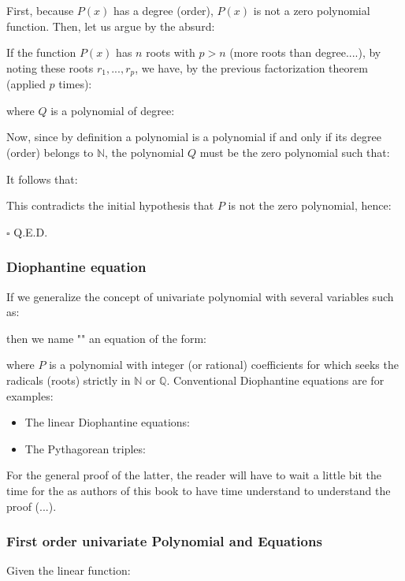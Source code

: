 	\begin{dem}
	First, because $P(x)$ has a degree (order), $P(x)$ is not a zero polynomial function. Then, let us argue by the absurd:
	
	If the function $P(x)$ has $n$ roots with $p>n$ (more roots than degree....), by noting these roots $r_1,...,r_p$, we have, by the previous  factorization theorem (applied $p$ times):
	
	where $Q$ is a polynomial of degree:
	
	Now, since by definition a polynomial is a polynomial if and only if its degree (order) belongs to  $\mathbb{N}$, the polynomial $Q$ must be the zero polynomial such that:
	
	It follows that:
	
	This contradicts the initial hypothesis that $P$ is not the zero polynomial, hence:
	
	\begin{flushright}
		$\square$  Q.E.D.
	\end{flushright}
	\end{dem}
	
	\subsubsection{Diophantine equation}\label{diophantine equation}
	If we generalize the concept of univariate polynomial with several variables such as:
	
	then we name "" an equation of the form:
	
	where $P$ is a polynomial with integer (or rational) coefficients for which seeks the radicals (roots) strictly in $\mathbb{N}$ or $\mathbb{Q}$. Conventional Diophantine equations are for examples:
	\begin{itemize}
		\item  The linear Diophantine equations:
		
		
		\item The Pythagorean triples:
			
	\end{itemize}
	For the general proof of the latter, the reader will have to wait a little bit the time for the as authors of this book to have time understand to understand the proof (...).
	
	\subsubsection{First order univariate Polynomial and Equations}
	Given the linear function:
	
